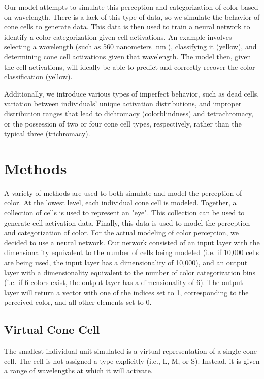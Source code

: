 \documentclass[titlepage]{article}
\begin{document}
Our model attempts to simulate this perception and categorization of color based on wavelength. There is a lack of this type of data, so we simulate the behavior of cone cells to generate data. This data is then used to train a neural network to identify a color categorization given cell activations. An example involves selecting a wavelength (such as 560 nanometers [nm]), classifying it (yellow), and determining cone cell activations given that wavelength. The model then, given the cell activations, will ideally be able to predict and correctly recover the color classification (yellow).

\bigskip

Additionally, we introduce various types of imperfect behavior, such as dead cells, variation between individuals' unique activation distributions, and improper distribution ranges that lead to dichromacy (colorblindness) and tetrachromacy, or the possession of two or four cone cell types, respectively, rather than the typical three (trichromacy).

\section{Methods}

A variety of methods are used to both simulate and model the perception of color. At the lowest level, each individual cone cell is modeled. Together, a collection of cells is used to represent an "eye". This collection can be used to generate cell activation data. Finally, this data is used to model the perception and categorization of color. For the actual modeling of color perception, we decided to use a neural network. Our network consisted of an input layer with the dimensionality equivalent to the number of cells being modeled (i.e. if 10,000 cells are being used, the input layer has a dimensionality of 10,000), and an output layer with a dimensionality equivalent to the number of color categorization bins (i.e. if 6 colors exist, the output layer has a dimensionality of 6). The output layer will return a vector with one of the indices set to 1, corresponding to the perceived color, and all other elements set to 0.

\subsection{Virtual Cone Cell}

The smallest individual unit simulated is a virtual representation of a single cone cell. The cell is not assigned a type explicitly (i.e., L, M, or S). Instead, it is given a range of wavelengths at which it will activate.
\end{document}
